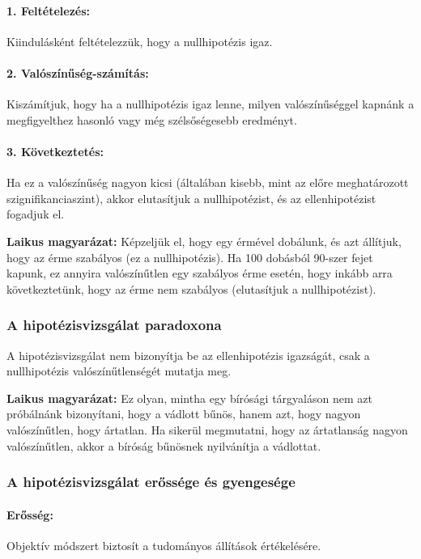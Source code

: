 \documentclass[a4paper,12pt]{article}
\begin{document}
    \paragraph{1. Feltételezés:}
    Kiindulásként feltételezzük, hogy a nullhipotézis igaz.

    \paragraph{2. Valószínűség-számítás:}
    Kiszámítjuk, hogy ha a nullhipotézis igaz lenne, milyen valószínűséggel kapnánk a megfigyelthez hasonló vagy még szélsőségesebb eredményt.

    \paragraph{3. Következtetés:}
    Ha ez a valószínűség nagyon kicsi (általában kisebb, mint az előre meghatározott szignifikanciaszint), akkor elutasítjuk a nullhipotézist, és az ellenhipotézist fogadjuk el.

    \textbf{Laikus magyarázat:}
    Képzeljük el, hogy egy érmével dobálunk, és azt állítjuk, hogy az érme szabályos (ez a nullhipotézis). Ha 100 dobásból 90-szer fejet kapunk, ez annyira valószínűtlen egy szabályos érme esetén, hogy inkább arra következtetünk, hogy az érme nem szabályos (elutasítjuk a nullhipotézist).

    \subsubsection{A hipotézisvizsgálat paradoxona}

    A hipotézisvizsgálat nem bizonyítja be az ellenhipotézis igazságát, csak a nullhipotézis valószínűtlenségét mutatja meg.

    \textbf{Laikus magyarázat:}
    Ez olyan, mintha egy bírósági tárgyaláson nem azt próbálnánk bizonyítani, hogy a vádlott bűnös, hanem azt, hogy nagyon valószínűtlen, hogy ártatlan. Ha sikerül megmutatni, hogy az ártatlanság nagyon valószínűtlen, akkor a bíróság bűnösnek nyilvánítja a vádlottat.

    \subsubsection{A hipotézisvizsgálat erőssége és gyengesége}

    \paragraph{Erősség:}
    Objektív módszert biztosít a tudományos állítások értékelésére.
\end{document}
